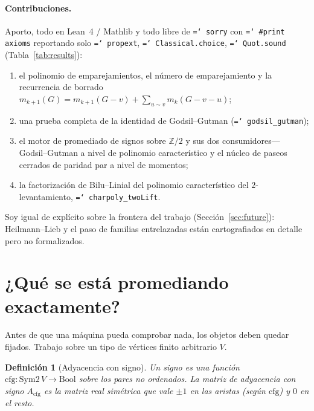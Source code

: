 \documentclass[11pt]{article}
\newtheorem{definition}{Definición}
\newcommand{\lean}[1]{\texttt{\hyphenchar\font=`\- #1}}
\newcommand{\Z}{\mathbb{Z}}
\begin{document}
\paragraph{Contribuciones.}
Aporto, todo en Lean~4 / Mathlib y todo libre de \lean{sorry} con
\lean{\#print axioms} reportando solo \lean{propext}, \lean{Classical.choice},
\lean{Quot.sound} (Tabla~\ref{tab:results}):
\begin{enumerate}\itemsep2pt
\item el polinomio de emparejamientos, el número de emparejamiento y la
  recurrencia de borrado $m_{k+1}(G)=m_{k+1}(G{-}v)+\sum_{u\sim v}m_k(G{-}v{-}u)$;
\item una prueba completa de la identidad de Godsil--Gutman (\lean{godsil\_gutman});
\item el motor de promediado de signos sobre $\Z/2$ y sus dos consumidores---
  Godsil--Gutman a nivel de polinomio característico y el núcleo de paseos
  cerrados de paridad par a nivel de momentos;
\item la factorización de Bilu--Linial del polinomio característico del
  $2$-levantamiento, \lean{charpoly\_twoLift}.
\end{enumerate}
Soy igual de explícito sobre la frontera del trabajo
(Sección~\ref{sec:future}): Heilmann--Lieb y el paso de familias entrelazadas
están cartografiados en detalle pero no formalizados.



\section{¿Qué se está promediando exactamente?}
\label{sec:setting}

Antes de que una máquina pueda comprobar nada, los objetos deben quedar fijados.
Trabajo sobre un tipo de vértices finito arbitrario $V$.

\begin{definition}[Adyacencia con signo]
Un signo es una función $\mathrm{cfg}\colon \mathrm{Sym2}\,V\to\mathrm{Bool}$
sobre los pares no ordenados. La matriz de adyacencia con signo
$A_{\mathrm{cfg}}$ es la matriz real simétrica que vale $\pm1$ en las aristas
(según $\mathrm{cfg}$) y $0$ en el resto.
\end{definition}
\end{document}
